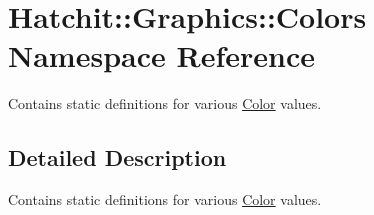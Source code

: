 \hypertarget{namespaceHatchit_1_1Graphics_1_1Colors}{}\section{Hatchit\+:\+:Graphics\+:\+:Colors Namespace Reference}
\label{namespaceHatchit_1_1Graphics_1_1Colors}


Contains static definitions for various \hyperlink{classHatchit_1_1Graphics_1_1Color}{Color} values.  




\subsection{Detailed Description}
Contains static definitions for various \hyperlink{classHatchit_1_1Graphics_1_1Color}{Color} values. 